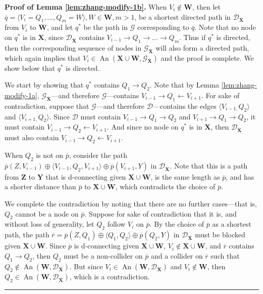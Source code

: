 \documentclass[11pt]{article}
\DeclareMathOperator{\An}{An}
\newcommand{\BlackBox}{\rule{1.5ex}{1.5ex}}  %
\newcommand{\mb}[1]{\mathbf{#1}}
\newcommand{\g}[1][G]{\mathcal{#1}}
\newenvironment{proofof}[1][]{\noindent \textbf{Proof of #1.}}{\hfill\BlackBox}
\begin{document}
\begin{proofof}[Lemma \ref{lem:zhang-modify-1b}]
    When $V_i \notin \mb{W}$, then let $\overline{q} = \langle V_i=Q_1, \dots, Q_m=W \rangle, W \in \mb{W}, m > 1$, be a shortest directed path in $\g[D]_{\overline{\mb{X}}}$ from $V_i$ to $\mb{W}$, and let $q^*$ be the path in $\g$ corresponding to $\overline{q}$. Note that no node on $q^*$ is in $\mb{X}$, since $\g[D]_{\overline{\mb{X}}}$ contains $V_{i-1} \to Q_1 \to \dots \to Q_m$. Thus if $q^*$ is directed, then the corresponding sequence of nodes in $\g_{\overline{\mb{X}}}$ will also form a directed path, which again implies that $V_i \in \An(\mb{X} \cup \mb{W}, \g_{\overline{\mb{X}}})$ and the proof is complete. We show below that $q^*$ is directed.

    We start by showing that $q^*$ contains $Q_1 \to Q_2$. Note that by Lemma \ref{lem:zhang-modify-1a}, $\g_{\overline{\mb{X}}}$---and therefore $\g$---contains $V_{i-1} \to Q_1 \gets V_{i+1}$. For sake of contradiction, suppose that $\g$---and therefore $\g[D]$---contains the edges $\langle V_{i-1,} Q_2 \rangle$ and $\langle V_{i+1,} Q_2 \rangle$. Since $\g[D]$ must contain $V_{i-1} \to Q_1 \to Q_2$ and $V_{i+1} \to Q_1 \to Q_2$, it must contain $V_{i-1} \to Q_2 \gets V_{i+1}$. And since no node on $q^*$ is in $\mb{X}$, then $\g[D]_{\overline{\mb{X}}}$ must also contain $V_{i-1} \to Q_2 \gets V_{i+1}$.

    When $Q_2$ is not on $\overline{p}$, consider the path $\overline{p}(Z, V_{i-1}) \oplus \langle V_{i-1}, Q_2, V_{i+1} \rangle \oplus \overline{p}(V_{i+1}, Y)$ in $\g[D]_{\overline{\mb{X}}}$. Note that this is a path from $\mb{Z}$ to $\mb{Y}$ that is d-connecting given $\mb{X} \cup \mb{W}$, is the same length as $\overline{p}$, and has a shorter distance than $\overline{p}$ to $\mb{X} \cup \mb{W}$, which contradicts the choice of $\overline{p}$. 
    
    We complete the contradiction by noting that there are no further cases---that is, $Q_2$ cannot be a node on $\overline{p}$. Suppose for sake of contradiction that it is, and without loss of generality, let $Q_2$ follow $V_i$ on $\overline{p}$. By the choice of $\overline{p}$ as a shortest path, the path $\overline{r} = \overline{p}(Z, Q_1) \oplus \langle Q_1, Q_2 \rangle \oplus \overline{p}(Q_2, Y)$ in $\g[D]_{\overline{\mb{X}}}$ must be blocked given $\mb{X} \cup \mb{W}$. Since $\overline{p}$ is d-connecting given $\mb{X} \cup \mb{W}$, $V_i \notin \mb{X} \cup \mb{W}$, and $\overline{r}$ contains $Q_1 \to Q_2$, then $Q_2$ must be a non-collider on $\overline{p}$ and a collider on $\overline{r}$ such that $Q_2 \notin \An(\mb{W}, \g[D]_{\overline{\mb{X}}})$. But since $V_i \in \An(\mb{W}, \g[D]_{\overline{\mb{X}}})$ and $V_i \notin \mb{W}$, then $Q_2 \in \An(\mb{W}, \g[D]_{\overline{\mb{X}}})$, which is a contradiction.
    

\end{proofof}
\end{document}
